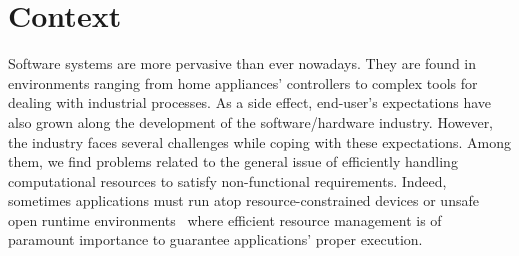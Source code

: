 \section{Context}

Software systems are more pervasive than ever nowadays.
They are found in environments ranging from home appliances' controllers to complex tools for dealing with industrial processes.
As a side effect, end-user's expectations have also grown along the development of the software/hardware industry.
However, the industry faces several challenges while coping with these expectations.
Among them, we find problems related to the general issue of efficiently handling computational resources to satisfy non-functional requirements.
Indeed, sometimes applications must run atop resource-constrained devices or unsafe open runtime environments~\cite{baresi2006toward} where efficient resource management is of paramount importance to guarantee applications' proper execution.

